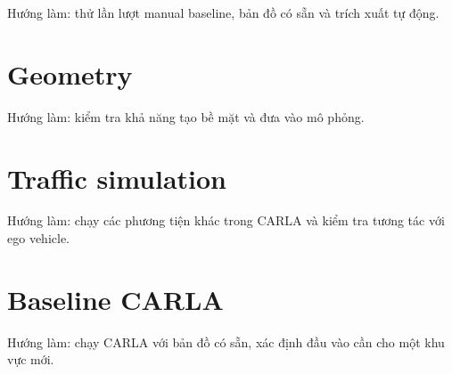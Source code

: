 Hướng làm: thử lần lượt manual baseline, bản đồ có sẵn và trích xuất tự động.

\section{Geometry}

Hướng làm: kiểm tra khả năng tạo bề mặt và đưa vào mô phỏng.

\section{Traffic simulation}

Hướng làm: chạy các phương tiện khác trong CARLA và kiểm tra tương tác với ego vehicle.

\section{Baseline CARLA}

Hướng làm: chạy CARLA với bản đồ có sẵn, xác định đầu vào cần cho một khu vực mới.
